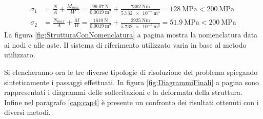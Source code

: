 \begin{align*}
    \sigma_1 &= \frac{N}{A} + \frac{M_{max}}{W} = \frac{\SI{96.07}{\newton}}{\SI{0.0019}{\metre\squared}} + \frac{\SI{7362}{\newton\metre}}{\SI{5.732e-5}{\metre\cubed}} = \SI{128}{\mega\pascal}< \SI{200}{\mega\pascal}\\
    \sigma_2 &= \frac{N_{max}}{A} + \frac{M}{W} = \frac{\SI{1610}{\newton}}{\SI{0.0019}{\metre\squared}} + \frac{\SI{2925}{\newton\metre}}{\SI{5.732e-5}{\metre\cubed}} =\SI{51.9}{\mega\pascal} < \SI{200}{\mega\pascal}
\end{align*}
La figura \ref{fig:StrutturaConNomenclatura} a pagina \pageref{fig:StrutturaConNomenclatura} mostra la nomenclatura data ai nodi e alle aste. Il sistema di riferimento utilizzato varia in base al metodo utilizzato.

Si elencheranno ora le tre diverse tipologie di risoluzione del problema spiegando sinteticamente i passaggi effettuati. 
In figura \ref{fig:DiagrammiFinali} a pagina \pageref{fig:DiagrammiFinali} sono rappresentati i diagrammi delle sollecitazioni e la deformata della struttura.
Infine nel paragrafo \ref{cap:cap4} è presente un confronto dei risultati ottenuti con i diversi metodi.

	
    
    
\pagebreak
{}
